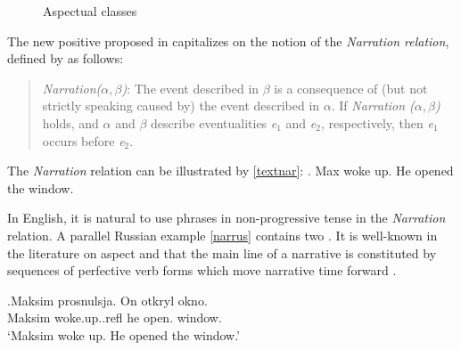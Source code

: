 \begin{figure}
\caption{\label{circles}Aspectual classes}
\end{figure}

The new positive  proposed in \citet{ZinovaFilip:13} capitalizes on the notion of the \textit{Narration relation}, defined by \citet{Lascarides:93} as follows:

\begin{quote}
\textit{Narration($\alpha,\beta$)}: The event described in $\beta$ is a consequence of (but not strictly speaking caused by) the event described in $\alpha$. If \textit{Narration ($\alpha,\beta$)} holds, and $\alpha$ and $\beta$ describe eventualities \textit{e$_1$} and \textit{e$_2$}, respectively, then \textit{e$_1$} occurs before \textit{e$_2$}.
\end{quote}

The \textit{Narration} relation can be illustrated by \ref{textnar}: 
\ex.\label{textnar} Max woke up. He opened the window. 

In English, it is natural to use  phrases in non-progressive tense in the \textit{Narration} relation. A parallel Russian example \ref{narrus} contains two . It is well-known  in the literature on aspect and  that the main line of a narrative is constituted by sequences of perfective verb forms which move narrative time forward \citep[for Russian, see in particular][]{Paducheva:96, Paducheva:04}.

\exg.\label{narrus}Maksim prosnulsja\textsuperscript{\PF}. On otkryl\textsuperscript{\PF} okno.\\
Maksim woke.up..refl he open. window.\\
\trans `Maksim woke up. He opened the window.'

